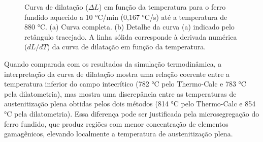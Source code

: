 \begin{figure}
	\quad
	\caption{Curva de dilatação ($\Delta L$) em função da temperatura para o ferro fundido aquecido a 10 °C/min (0,167 °C/s) até a temperatura de 880 °C. (a) Curva completa. (b) Detalhe da curva (a) indicado pelo retângulo tracejado. A linha sólida corresponde à derivada numérica ($dL/dT$) da curva de dilatação em função da temperatura.}
	\label{fig:dilTempera}
\end{figure}

Quando comparada com os resultados da simulação termodinâmica, a interpretação da curva de dilatação mostra uma relação coerente entre a temperatura inferior do campo intecrítico (782 °C pelo Thermo-Calc\textregistered{} e 783 °C pela dilatometria), mas mostra uma discrepância entre as temperaturas de austenitização plena obtidas pelos dois métodos (814 °C pelo Thermo-Calc\textregistered{} e 854 °C pela dilatometria). Essa diferença pode ser justificada pela microsegregação do ferro fundido, que produz regiões com menor concentração de elementos gamagênicos, elevando localmente a temperatura de austenitização plena.

